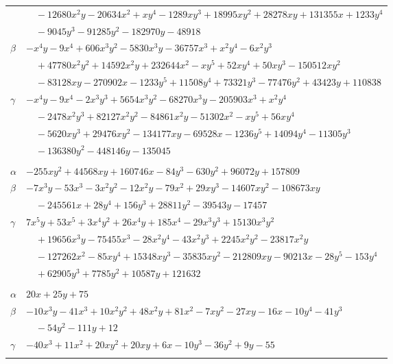 \documentclass[11pt]{article}
\begin{document}
\begin{longtable}{@{}ll@{}}
 & $\quad -12680x^{2}y-20634x^{2}+xy^{4}-1289xy^{3}+18995xy^{2}+28278xy+131355x+1233y^{4}$\\
 & $\quad -9045y^{3}-91285y^{2}-182970y-48918$\\
$\beta$ & $-x^{4}y-9x^{4}+606x^{3}y^{2}-5830x^{3}y-36757x^{3}+x^{2}y^{4}-6x^{2}y^{3}$\\
 & $\quad +47780x^{2}y^{2}+14592x^{2}y+232644x^{2}-xy^{5}+52xy^{4}+50xy^{3}-150512xy^{2}$\\
 & $\quad -83128xy-270902x-1233y^{5}+11508y^{4}+73321y^{3}-77476y^{2}+43423y+110838$\\
$\gamma$ & $-x^{4}y-9x^{4}-2x^{3}y^{3}+5654x^{3}y^{2}-68270x^{3}y-205903x^{3}+x^{2}y^{4}$\\
 & $\quad -2478x^{2}y^{3}+82127x^{2}y^{2}-84861x^{2}y-51302x^{2}-xy^{5}+56xy^{4}$\\
 & $\quad -5620xy^{3}+29476xy^{2}-134177xy-69528x-1236y^{5}+14094y^{4}-11305y^{3}$\\
 & $\quad -136380y^{2}-448146y-135045$\\
\addlinespace[3pt]
\multicolumn{2}{@{}l}{$\{i,j\}=\{53,214\}$, $k_{ij}=2^{5}\cdot 3^{3}\cdot 5\cdot 13$}\\
$\alpha$ & $-255xy^{2}+44568xy+160746x-84y^{3}-630y^{2}+96072y+157809$\\
$\beta$ & $-7x^{3}y-53x^{3}-3x^{2}y^{2}-12x^{2}y-79x^{2}+29xy^{3}-14607xy^{2}-108673xy$\\
 & $\quad -245561x+28y^{4}+156y^{3}+28811y^{2}-39543y-17457$\\
$\gamma$ & $7x^{5}y+53x^{5}+3x^{4}y^{2}+26x^{4}y+185x^{4}-29x^{3}y^{3}+15130x^{3}y^{2}$\\
 & $\quad +19656x^{3}y-75455x^{3}-28x^{2}y^{4}-43x^{2}y^{3}+2245x^{2}y^{2}-23817x^{2}y$\\
 & $\quad -127262x^{2}-85xy^{4}+15348xy^{3}-35835xy^{2}-212809xy-90213x-28y^{5}-153y^{4}$\\
 & $\quad +62905y^{3}+7785y^{2}+10587y+121632$\\
\addlinespace[3pt]
\multicolumn{2}{@{}l}{$\{i,j\}=\{54,87\}$, $k_{ij}=2^{2}\cdot 3\cdot 5$}\\
$\alpha$ & $20x+25y+75$\\
$\beta$ & $-10x^{3}y-41x^{3}+10x^{2}y^{2}+48x^{2}y+81x^{2}-7xy^{2}-27xy-16x-10y^{4}-41y^{3}$\\
 & $\quad -54y^{2}-111y+12$\\
$\gamma$ & $-40x^{3}+11x^{2}+20xy^{2}+20xy+6x-10y^{3}-36y^{2}+9y-55$\\
\addlinespace[3pt]
\multicolumn{2}{@{}l}{$\{i,j\}=\{54,118\}$, $k_{ij}=2^{2}$}\\

\end{longtable}
\end{document}
